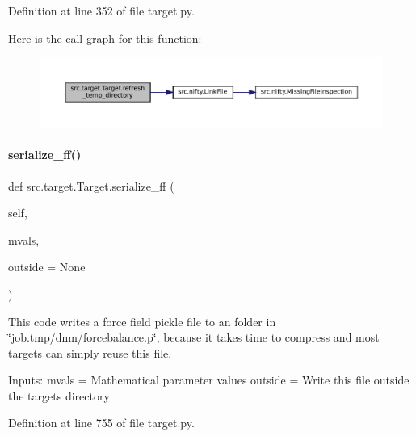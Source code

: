 Definition at line 352 of file target.\+py.

Here is the call graph for this function\+:
\nopagebreak
\begin{figure}[H]
\begin{center}
\leavevmode
\includegraphics[width=350pt]{classsrc_1_1target_1_1Target_ad8126429a9b72dff627da96934cd7f5c_cgraph}
\end{center}
\end{figure}
\mbox{\label{classsrc_1_1target_1_1Target_a8d05de21b2477b71aa74ea001f4d62b5}} 
\paragraph{\texorpdfstring{serialize\+\_\+ff()}{serialize\_ff()}}
{\footnotesize\ttfamily def src.\+target.\+Target.\+serialize\+\_\+ff (\begin{DoxyParamCaption}\item[{}]{self,  }\item[{}]{mvals,  }\item[{}]{outside = {\ttfamily None} }\end{DoxyParamCaption})}



This code writes a force field pickle file to an folder in \char`\"{}job.\+tmp/dnm/forcebalance.\+p\char`\"{}, because it takes time to compress and most targets can simply reuse this file. 

Inputs\+: mvals = Mathematical parameter values outside = Write this file outside the targets directory 

Definition at line 755 of file target.\+py.

\mbox{\label{classsrc_1_1target_1_1Target_af543ca7235b5112aa29018ffa7bc1e1c}} 
